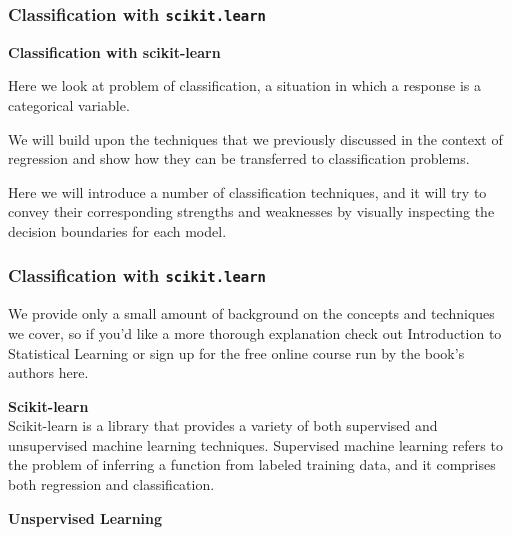 \documentclass[MASTER.tex]{subfiles}
\begin{document}
 
 
  \frametitle{Classification with \texttt{scikit.learn}}
   
\noindent \textbf{Classification with scikit-learn}
 
\item Here we look at problem of classification, a situation in which a response is a categorical variable. 
\item We will build upon the techniques that we previously discussed in the context of regression and show how they can be transferred to classification problems. 
\item Here we will introduce a number of classification techniques, and it will try to convey their corresponding strengths and weaknesses by visually inspecting the decision boundaries for each model.
 

 
 
 \frametitle{Classification with \texttt{scikit.learn}}
  
  
  We provide only a small amount of background on the concepts and techniques we cover, so if you’d like a more thorough explanation check out Introduction to Statistical Learning or sign up for the free online course run by the book’s authors here.
  

 
%  
% 
 
  
\noindent \textbf{Scikit-learn}\\
  
  Scikit-learn is a library that provides a variety of both supervised and unsupervised machine learning techniques. 
  Supervised machine learning refers to the problem of inferring a function from labeled training data, and it comprises both regression and classification. 
  


 
 
  
 
\noindent \textbf{Unspervised Learning}
  
\end{document}
